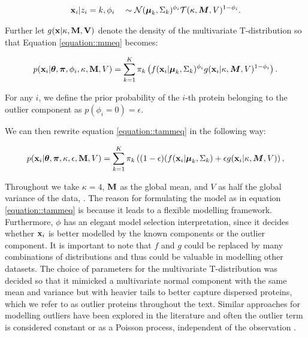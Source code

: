 \documentclass[10pt,letterpaper]{article}\usepackage[]{graphicx}\usepackage[]{color}
\begin{document}
\begin{align}
{\bf x}_i | z_i = k, \phi_i \quad \sim \mathcal{N}(\boldsymbol{\mu}_k, \Sigma_k)^{\phi_i}\mathcal{T}(\kappa, \boldsymbol{M}, V)^{1 - \phi_i }.
\end{align}

Further let $g({\bf x | \kappa, \bf{M}, V} )$ denote the density of
the multivariate T-distribution so that Equation
\eqref{equation::mmeq} becomes:

\begin{equation} \label{equation::tammeq}
  \begin{split}
    p({\bf x}_i| \boldsymbol{\theta}, \boldsymbol{\pi} ,\phi_i, \kappa, {\bf M}, V) &=  \sum_{k=1}^{K}\pi_k\left(f({\bf x}_i|\boldsymbol{\mu}_k, \Sigma_k)^{\phi_i}g({\bf x}_i|\kappa, \boldsymbol{M}, V)^{1 - \phi_i }\right).\\
  \end{split}
\end{equation}

For any $i$, we define the prior probability of the $i$-th protein
belonging to the outlier component as $p(\phi_i = 0) = \epsilon$.

We can then rewrite equation \eqref{equation::tammeq} in the following way:

\begin{equation}\label{equation::tammepseq}
  \begin{split}
    p({\bf x}_i| \boldsymbol{\theta}, \boldsymbol{\pi} , \kappa, \epsilon, {\bf M}, V) &=  \sum_{k=1}^{K}\pi_k\left((1-\epsilon)(f({\bf x}_i |\boldsymbol{\mu}_k, \Sigma_k) + \epsilon g({\bf x}_i|\kappa, \boldsymbol{M}, V)\right),\\
  \end{split}
\end{equation}

Throughout we take $\kappa = 4$, ${\bf M}$ as the global mean, and $V$
as half the global variance of the data, {\color{black}{including labelled and unlabelled proteins}}.
The reason for formulating
the model as in equation \eqref{equation::tammeq} is because it leads
to a flexible modelling framework. Furthermore, $\phi$ has an elegant
model selection interpretation, since it decides whether ${\bf x}_i$
is better modelled by the known components or the outlier component.
It is important to note that $f$ and $g$ could be replaced by many
combinations of distributions and thus could be valuable in modelling
other datasets. The choice of parameters for the multivariate
T-distribution was decided so that it mimicked a multivariate normal
component with the same mean and variance but with heavier tails to
better capture dispersed proteins, which we refer to as outlier
proteins throughout the text. {\color{black}{The variance of the multivariate T-distribution
is designed to be large such that is relatively flat when compared with multivariate Gaussian
distributions which describe annotated components. }} Similar approaches for modelling
outliers have been explored in the literature and often the outlier
term is considered constant or as a Poisson process, independent of
the observation \cite{Banfield::1993, Cooke::2011, Coretto::2016,
  Hennig::2004}.
\end{document}
